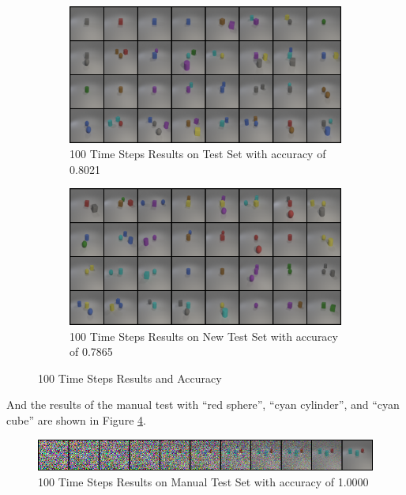 \begin{figure}[H]
    \centering
    \begin{subfigure}{0.48\textwidth}
        \centering
        \includegraphics[width=\textwidth]{figures/step_100_test.png}
        \caption{100 Time Steps Results on Test Set with accuracy of 0.8021}
        \label{fig:step_100_test}
    \end{subfigure}
    \hfill
    \begin{subfigure}{0.48\textwidth}
        \centering
        \includegraphics[width=\textwidth]{figures/step_100_new_test.png}
        \caption{100 Time Steps Results on New Test Set with accuracy of 0.7865}
        \label{fig:step_100_new_test}
    \end{subfigure}
    \caption{100 Time Steps Results and Accuracy}
    \label{fig:step_100}
\end{figure}

And the results of the manual test with ``red sphere'', ``cyan cylinder'', and ``cyan cube'' are shown in Figure \ref{fig:step_100_manual}.
\begin{figure}[H]
    \centering
    \includegraphics[width=\textwidth]{figures/step_100_manual_test.png}
    \caption{100 Time Steps Results on Manual Test Set with accuracy of 1.0000}
    \label{fig:step_100_manual}
\end{figure}

